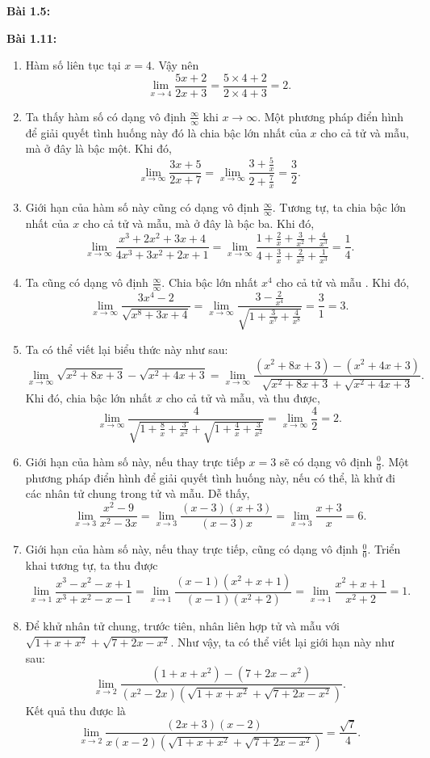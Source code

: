 \vspace{5pt}
\textbf{Bài 1.5:}

\vspace{5pt}
\textbf{Bài 1.11:}
\begin{enumerate}[label=(\alph*)]   
    \item Hàm số liên tục tại \(x=4\). Vậy nên \[\lim_{x\rightarrow 4}\frac{5x+2}{2x+3}=\frac{5\times 4+2}{2\times 4+3}=2.\]
    \item Ta thấy hàm số có dạng vô định \(\frac{\infty}{\infty}\) khi \(x\rightarrow\infty\). Một phương pháp điển hình để giải quyết tình huống này đó là chia bậc lớn nhất của \(x\) cho cả tử và mẫu, mà ở đây là bậc một. Khi đó, \[\lim_{x\rightarrow\infty}\frac{3x+5}{2x+7}=\lim_{x\rightarrow\infty}\frac{3+\frac{5}{x}}{2+\frac{7}{x}}=\frac{3}{2}.\] 
    \item Giới hạn của hàm số này cũng có dạng vô định \(\frac{\infty}{\infty}\). Tương tự, ta chia bậc lớn nhất của \(x\) cho cả tử và mẫu, mà ở đây là bậc ba. Khi đó, \[\lim_{x\rightarrow\infty}\frac{x^3 +2x^2 +3x+4}{4x^3 +3x^2 +2x+1}=\lim_{x\rightarrow\infty}\frac{1+\frac{2}{x}+\frac{3}{x^2}+\frac{4}{x^3}}{4+\frac{3}{x}+\frac{2}{x^2}+\frac{1}{x^3}}=\frac{1}{4}.\]
    \item Ta cũng có dạng vô định \(\frac{\infty}{\infty}\). Chia bậc lớn nhất  \(x^4\) cho cả tử và mẫu . Khi đó, \[\lim_{x\rightarrow\infty}\frac{3x^4 -2}{\sqrt{x^8+3x+4}}=\lim_{x\rightarrow\infty}\frac{3-\frac{2}{x^4}}{\sqrt{1+\frac{3}{x^7}+\frac{4}{x^8}}}=\frac{3}{1}=3.\]
    \item Ta có thể viết lại biểu thức này như sau: \[\lim_{x\rightarrow\infty}\sqrt{x^2 +8x+3}-\sqrt{x^2+4x+3}=\lim_{x\rightarrow\infty}\frac{(x^2 +8x+3)-(x^2+4x+3)}{\sqrt{x^2 +8x+3}+\sqrt{x^2+4x+3}}.\] Khi đó, chia bậc lớn nhất \(x\) cho cả tử và mẫu, và thu được, \[\lim_{x\rightarrow\infty}\frac{4}{\sqrt{1+\frac{8}{x}+\frac{3}{x^2}}+\sqrt{1+\frac{4}{x}+\frac{3}{x^2}}}=\lim_{x\rightarrow\infty}\frac{4}{2}=2.\]
    \item Giới hạn của hàm số này, nếu thay trực tiếp \(x=3\) sẽ có dạng vô định \(\frac{0}{0}\). Một phương pháp điển hình để giải quyết tình huống này, nếu có thể, là khử đi các nhân tử chung trong tử và mẫu. Dễ thấy, \[\lim_{x\rightarrow 3}\frac{x^2 -9}{x^2-3x}=\lim_{x\rightarrow 3}\frac{(x-3)(x+3)}{(x-3)x}=\lim_{x\rightarrow 3}\frac{x+3}{x}=6.\]  
    \item Giới hạn của hàm số này, nếu thay trực tiếp, cũng có dạng vô định \(\frac{0}{0}\). Triển khai tương tự, ta thu được \[\lim_{x\rightarrow 1}\frac{x^3 -x^2 -x+1}{x^3+x^2 -x-1}=\lim_{x\rightarrow 1}\frac{(x-1)(x^2+x+1)}{(x-1)(x^2+2)}=\lim_{x\rightarrow 1}\frac{x^2+x+1}{x^2+2}=1.\]
    \item Để khử nhân tử chung, trước tiên, nhân liên hợp tử và mẫu với \(\sqrt{1+x+x^2}+\sqrt{7+2x-x^2}\). Như vậy, ta có thể viết lại giới hạn này như sau: \[\lim_{x\rightarrow 2}\frac{(1+x+x^2)-(7+2x-x^2)}{(x^2-2x)(\sqrt{1+x+x^2}+\sqrt{7+2x-x^2})}.\] Kết quả thu được là \[\lim_{x\rightarrow 2}\frac{(2x+3)(x-2)}{x(x-2)(\sqrt{1+x+x^2}+\sqrt{7+2x-x^2})}=\frac{\sqrt{7}}{4}.\]    
\end{enumerate}
\vspace{5pt}


